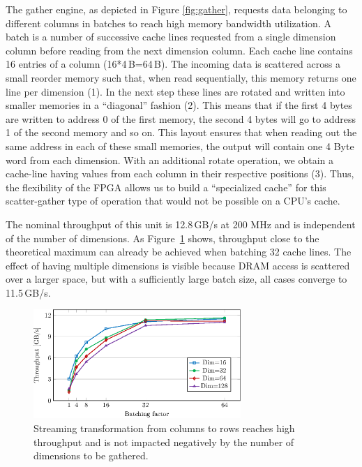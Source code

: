 \documentclass[11pt,dvipdfm]{article}
\begin{document}
The gather engine, as depicted in Figure \ref{fig:gather}, requests data belonging to different columns in batches to reach high memory bandwidth utilization. A batch is a number of successive cache lines requested from a single dimension column before reading from the next dimension column. Each cache line contains 16 entries of a column (16*4\,B=64\,B). The incoming data is scattered across a small reorder memory such that, when read sequentially, this memory returns one line per dimension (1). In the next step these lines are rotated and written into smaller memories in a ``diagonal'' fashion (2). This means that if the first 4 bytes are written to address 0 of the first memory, the second 4 bytes will go to address 1 of the second memory and so on. This layout ensures that when reading out the same address in each of these small memories, the output will contain one 4 Byte word from each dimension. With an additional rotate operation, we obtain a cache-line having values from each column in their respective positions (3). Thus, the flexibility of the FPGA allows us to build a ``specialized cache'' for this scatter-gather type of operation that would not be possible on a CPU's cache.

The nominal throughput of this unit is 12.8\,GB/s at 200 MHz and is independent of the number of dimensions. %
As Figure~\ref{fig:gatherthput} shows, throughput close to the theoretical maximum can already be achieved when batching 32 cache lines. The effect of having multiple dimensions is visible because DRAM access is scattered over a larger space, but with a sufficiently large batch size, all cases converge to 11.5\,GB/s.


\begin{figure}[t]
    \centering
    \includegraphics[width=0.7\textwidth]{figs/data-transformation-graph-crop.eps}
	\caption{Streaming transformation from columns to rows reaches high throughput and is not impacted negatively by the number of dimensions to be gathered.}
	\label{fig:gatherthput}
\end{figure}
\end{document}
